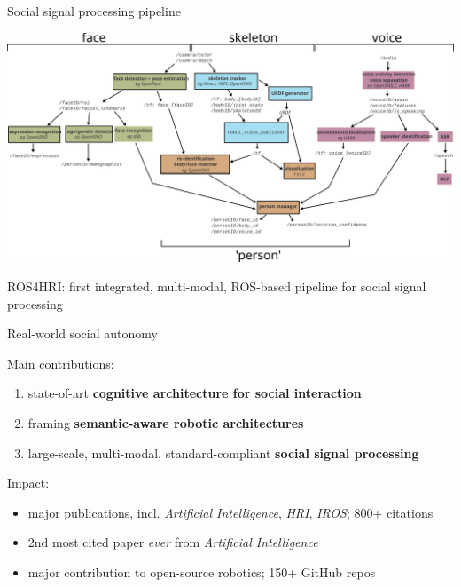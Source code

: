 \documentclass[xcolor=table]{beamer}
\begin{document}
{

\begin{frame}{Social signal processing pipeline}
    \begin{center}
        \includegraphics[width=\columnwidth]{architectures/ros4hri-pipeline}
    \end{center}
    ROS4HRI: first integrated, multi-modal, ROS-based pipeline for social signal
    processing
\end{frame}
}

\begin{frame}{Real-world social autonomy}

Main contributions:

    \begin{enumerate}
        \item state-of-art \textbf{cognitive architecture for social interaction}
        \item framing \textbf{semantic-aware robotic architectures}
        \item large-scale, multi-modal, standard-compliant \textbf{social signal
            processing}
    \end{enumerate}

Impact:
    \begin{itemize}
        \item major publications, incl. \emph{Artificial Intelligence},
            \emph{HRI}, \emph{IROS}; 800+ citations
        \item 2nd most cited paper \emph{ever} from \emph{Artificial Intelligence}
        \item major contribution to open-source robotics; 150+ GitHub repos
    \end{itemize}
\end{frame}
\end{document}
